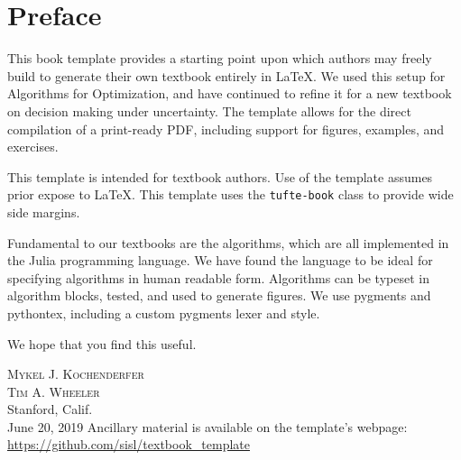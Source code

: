\chapter*{Preface}

This book template provides a starting point upon which authors may freely build to generate their own textbook entirely in \LaTeX.
We used this setup for Algorithms for Optimization, and have continued to refine it for a new textbook on decision making under uncertainty.
The template allows for the direct compilation of a print-ready PDF, including support for figures, examples, and exercises.

This template is intended for textbook authors.
Use of the template assumes prior expose to \LaTeX.
This template uses the \texttt{tufte-book} class to provide wide side margins.

Fundamental to our textbooks are the algorithms, which are all implemented in the Julia programming language.
We have found the language to be ideal for specifying algorithms in human readable form.
Algorithms can be typeset in algorithm blocks, tested, and used to generate figures.
We use pygments and pythontex, including a custom pygments lexer and style.

We hope that you find this useful.

\vspace{5ex}
\noindent\textsc{Mykel J. Kochenderfer}\\
\textsc{Tim A. Wheeler}\\
Stanford, Calif.\\
June 20, 2019
\vfill
\noindent Ancillary material is available on the template's webpage:\\
\noindent\url{https://github.com/sisl/textbook_template}